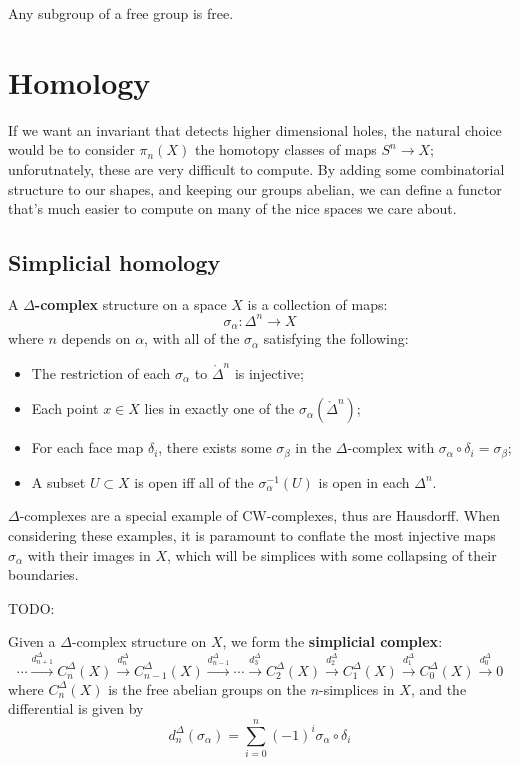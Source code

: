 \documentclass{article}
\begin{document}
\begin{proposition}
    Any subgroup of a free group is free.
\end{proposition}

\section{Homology}

If we want an invariant that detects higher dimensional holes, the natural choice would be to consider $\pi_n(X)$ the homotopy classes of maps $S^n\rightarrow X$; unforutnately, these are very difficult to compute. By adding some combinatorial structure to our shapes, and keeping our groups abelian, we can define a functor that's much easier to compute on many of the nice spaces we care about.

\subsection{Simplicial homology}

\begin{definition}
    A \textbf{$\Delta$-complex} structure on a space $X$ is a collection of maps: \[
    \sigma_{\alpha} : \Delta^n\rightarrow X
    \]where $n$ depends on $\alpha$, with all of the $\sigma_\alpha$ satisfying the following:\begin{itemize}
        \item The restriction of each $\sigma_\alpha$ to $\mathring{\Delta}^n$ is injective;
        \item Each point $x\in X$ lies in exactly one of the $\sigma_\alpha(\mathring{\Delta}^n)$;
        \item For each face map $\delta_i$, there exists some $\sigma_\beta$ in the $\Delta$-complex with $\sigma_\alpha\circ\delta_i=\sigma_\beta$;
        \item A subset $U\subset X$ is open iff all of the $\sigma_{\alpha}^{-1}(U)$ is open in each $\Delta^n$.
    \end{itemize}
\end{definition} 

$\Delta$-complexes are a special example of CW-complexes, thus are Hausdorff. When considering these examples, it is paramount to conflate the most injective maps $\sigma_\alpha$ with their images in $X$, which will be simplices with some collapsing of their boundaries.

TODO: 

\begin{definition}
    Given a $\Delta$-complex structure on $X$, we form the \textbf{simplicial complex}: \[
    \cdots \xrightarrow{d_{n+1}^\Delta} C_n^\Delta(X) \xrightarrow{d_n^\Delta} C_{n-1}^\Delta(X) \xrightarrow{d_{n-1}^\Delta} \cdots \xrightarrow{d_3^\Delta} C_2^\Delta(X) \xrightarrow{d_2^\Delta} C_1^\Delta(X) \xrightarrow{d_1^\Delta} C_0^\Delta(X) \xrightarrow{d_0^\Delta} 0
    \] where $C_n^\Delta(X)$ is the free abelian groups on the $n$-simplices in $X$, and the differential is given by \[
    d_n^\Delta(\sigma_\alpha) = \sum_{i=0}^n(-1)^i\sigma_\alpha\circ\delta_i
    \]
\end{definition}
\end{document}
